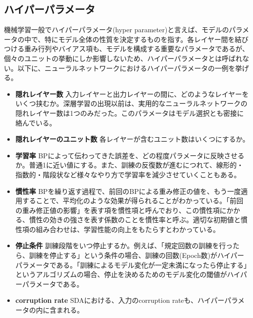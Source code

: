 \subsection{ハイパーパラメータ}
機械学習一般でハイパーパラメータ(hyper parameter)と言えば、モデルのパラメータの中で、特にモデル全体の性質を決定するものを指す。各レイヤー間を結びつける重み行列やバイアス項も、モデルを構成する重要なパラメータであるが、個々のユニットの挙動にしか影響しないため、ハイパーパラメータとは呼ばれない。以下に、ニューラルネットワークにおけるハイパーパラメータの一例を挙げる。
\begin{itemize}
\item \textbf{隠れレイヤー数} 入力レイヤーと出力レイヤーの間に、どのようなレイヤーをいくつ挟むか。深層学習の出現以前は、実用的なニューラルネットワークの隠れレイヤー数は1つのみだった。このパラメータはモデル選択とも密接に絡んでいる。
\item \textbf{隠れレイヤーのユニット数} 各レイヤーが含むユニット数はいくつにするか。
\item \textbf{学習率} BPによって伝わってきた誤差を、どの程度パラメータに反映させるか。普通1に近い値にする。また、訓練の反復数が進むにつれて、線形的・指数的・階段状など様々なやり方で学習率を減少させていくこともある。
\item \textbf{慣性率} BPを繰り返す過程で、前回のBPによる重み修正の値を、もう一度適用することで、平均化のような効果が得られることがわかっている。「前回の重み修正値の影響」を表す項を慣性項と呼んでおり、この慣性項にかかる、慣性の効きの強さを表す係数のことを慣性率と呼ぶ。適切な初期値と慣性項の組み合わせは、学習性能の向上をもたらすとわかっている\cite{sutskever2013on-the-importance}。
\item \textbf{停止条件} 訓練段階をいつ停止するか。例えば、「規定回数の訓練を行ったら、訓練を停止する」という条件の場合、訓練の回数(Epoch数)がハイパーパラメータである。「訓練によるモデル変化が一定未満になったら停止する」というアルゴリズムの場合、停止を決めるためのモデル変化の閾値がハイパーパラメータである。
\item \textbf{corruption rate} SDAにおける、入力のcorruption rateも、ハイパーパラメータの内に含まれる。
\end{itemize}
